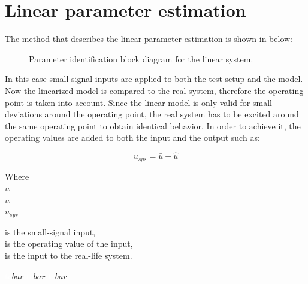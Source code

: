 \section{Linear parameter estimation} 
\label{LinParamEst}


The method that describes the linear parameter estimation is shown in  below:

\begin{figure}[H]
\centering
 
\caption{Parameter identification block diagram for the linear system. }
\label{fig:parame_block_lin}
\end{figure}

In this case small-signal inputs are applied to both the test setup and the model.  Now the linearized model is compared to the real system, therefore the operating point is taken into account. Since the linear model is only valid for small deviations around the operating point, the real system has to be excited around the same operating point to obtain identical behavior. In order to achieve it, the operating values are added to both the input and the output such as: 

\begin{equation}
u_{sys} = \bar{u} + \hat{u}
 \label{u_smallsignal}
\end{equation}

\begin{minipage}[t]{0.20\textwidth}
Where\\
\hspace*{8mm} $\hat{u}$ \\
\hspace*{8mm} $\bar{u}$ \\
\hspace*{8mm} $u_{sys}$ 
\end{minipage}
\begin{minipage}[t]{0.68\textwidth}
\vspace*{2mm}
is the small-signal input, \\
is the operating value of the input,\\
is the input to the real-life system. 
\end{minipage}
\begin{minipage}[t]{0.10\textwidth}
\vspace*{2mm}
\textcolor{White}{te}$\unit{bar}$
\textcolor{White}{te}$\unit{bar}$
\textcolor{White}{te}$\unit{bar}$
\end{minipage} 

